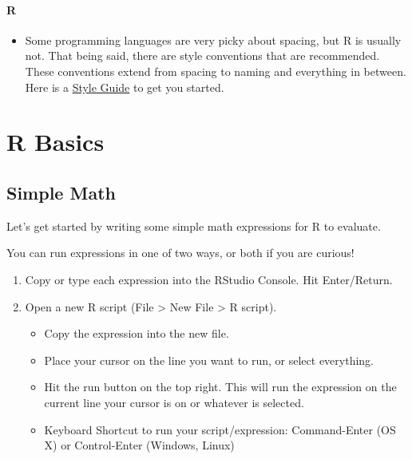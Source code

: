 \documentclass[]{article}
\providecommand{\tightlist}{%
  \setlength{\itemsep}{0pt}\setlength{\parskip}{0pt}}
\let\oldparagraph\paragraph
\renewcommand{\paragraph}[1]{\oldparagraph{#1}\mbox{}}
\begin{document}
\paragraph{R}\label{r}

\begin{itemize}
\tightlist
\item
  Some programming languages are very picky about spacing, but R is
  usually not. That being said, there are style conventions that are
  recommended. These conventions extend from spacing to naming and
  everything in between. Here is a
  \href{http://adv-r.had.co.nz/Style.html}{Style Guide} to get you
  started.
\end{itemize}

\section{R Basics}\label{r-basics}

\subsection{Simple Math}\label{simple-math}

Let's get started by writing some simple math expressions for R to
evaluate.

You can run expressions in one of two ways, or both if you are curious!

\begin{enumerate}
\def\labelenumi{\arabic{enumi}.}
\tightlist
\item
  Copy or type each expression into the RStudio Console. Hit
  Enter/Return.
\item
  Open a new R script (File \textgreater{} New File \textgreater{} R
  script).

  \begin{itemize}
  \tightlist
  \item
    Copy the expression into the new file.
  \item
    Place your cursor on the line you want to run, or select everything.
  \item
    Hit the run button on the top right. This will run the expression on
    the current line your cursor is on or whatever is selected.
  \item
    Keyboard Shortcut to run your script/expression: Command-Enter (OS
    X) or Control-Enter (Windows, Linux)
  \end{itemize}
\end{enumerate}
\end{document}
